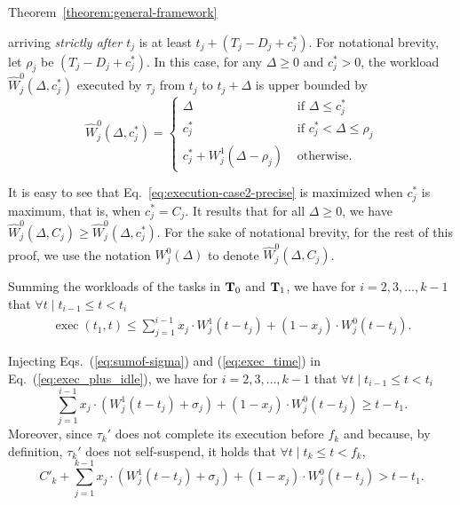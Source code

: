 \begin{appProof}{Theorem~\ref{theorem:general-framework}}
\begin{itemize}
  arriving \emph{strictly after $t_j$} is at least $t_j + (T_j-D_j +
  c_j^*)$. For notational brevity, let $\rho_j$ be
  $(T_j-D_j + c_j^*)$. In this case, for any $\Delta \geq 0$ and $c_j^* > 0$, the workload $\widehat{W}_j^0(\Delta, c_j^*)$ executed by $\tau_j$ from $t_j$ to $t_j+\Delta$ is upper bounded by
  \begin{equation}
  \label{eq:execution-case2-precise}
  \widehat{W}_j^0(\Delta, c_j^*)=
  \begin{cases}
    \Delta & \mbox{ if } \Delta \leq  c_j^*\\
    c_j^* & \mbox{ if } c_j^* < \Delta \leq  \rho_j\\
   c_j^* + W_j^1(\Delta-\rho_j) & \mbox{ otherwise}.
  \end{cases}
\end{equation}

It is easy to see that Eq.~\eqref{eq:execution-case2-precise} is maximized when $c_j^*$ is maximum, that is, when $c_j^* = C_j$. It results that for all $\Delta \geq 0$, we have $\widehat{W}_j^0(\Delta, C_j) \geq
\widehat{W}_j^0(\Delta, c_j^*)$. For the sake of notational brevity, for the rest of this proof, we use the notation $W_j^0(\Delta)$ to denote $\widehat{W}_j^0(\Delta, C_j)$.

\end{itemize}

Summing the workloads of the tasks in ${\bf T}_0$ and ${\bf T}_1$, we have
for $i=2,3,\ldots,k-1$ that $\forall t \mid t_{i-1} \leq t < t_i$
\begin{align}
\label{eq:exec_time}
\operatorname{exec}(t_1, t) \leq \sum_{j=1}^{i-1} x_j\cdot W_j^1(t-t_j)  + (1-x_j)\cdot W_j^0(t-t_j).
\end{align}

Injecting Eqs.~(\ref{eq:sumof-sigma}) and (\ref{eq:exec_time}) in Eq.~(\ref{eq:exec_plus_idle}), we have
for $i=2,3,\ldots,k-1$ that $\forall t \mid t_{i-1} \leq t < t_i$
\begin{equation}
\label{eq:exec_plus_idle-2}
\sum_{j=1}^{i-1} x_j\cdot (W_j^1(t-t_j) +\sigma_j) + (1-x_j)\cdot W_j^0(t-t_j) \geq t-t_1.
\end{equation}
Moreover, since $\tau_k'$ does not complete its execution before $f_k$ and because, by definition, $\tau_k'$ does not self-suspend, it holds that $\forall t \mid t_k \leq t < f_k$,
\begin{equation}
\label{eq:exec_plus_idle-3}
C'_k +\sum_{j=1}^{k-1} x_j\cdot (W_j^1(t-t_j) +\sigma_j) + (1-x_j)\cdot W_j^0(t-t_j) > t-t_1.
\end{equation}


\end{appProof}

